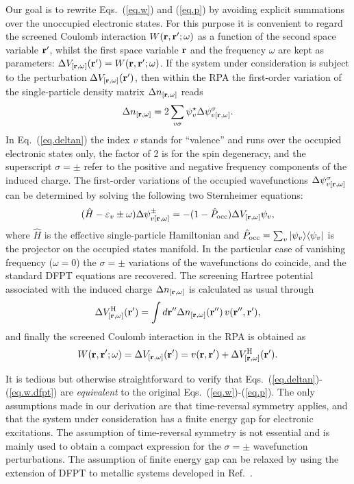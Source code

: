 \documentclass[twocolumn,prb,showpacs,superscriptaddress]{revtex4}
\def\w{\omega}
\def\H{\hat{H}}
\def\P{\hat{P}_{\rm occ}}
\def\E{\varepsilon}
\def\s{\sigma}
\def\r{{\bf r}}
\def\rp{{\bf r^\prime}}
\def\rpp{{\bf r^{\prime\prime}}}
\begin{document}
Our goal is to rewrite Eqs.\ (\ref{eq.w}) and (\ref{eq.p})
by avoiding explicit summations over the unoccupied electronic states.
For this purpose it is convenient to regard the screened Coulomb interaction
$W(\r,\rp;\w)$ as a function of the 
second space variable $\rp$, whilst the first space variable 
$\r$ and the frequency $\w$ are kept as parameters: $\Delta V_{[\r,\w]}(\rp) = W(\r,\rp;\w)$.
If the system under consideration is subject to the perturbation
$\Delta V_{[\r,\w]}(\rp)$, then within the RPA the first-order variation 
of the single-particle density matrix $\Delta n_{[\r,\w]}$ reads
  \begin{equation}\label{eq.deltan}
  \Delta n_{[\r,\w]} = 2\sum_{v\s} \psi_v^\star  \Delta \psi^\s_{v[\r,\w]}.
  \end{equation}
In Eq.\ (\ref{eq.deltan}) the index $v$ stands for ``valence'' and runs
over the occupied electronic states only, the factor of 2 is for the spin degeneracy, 
and the superscript $\sigma=\pm$ refer to the positive and negative
frequency components of the induced charge.
The first-order variations of the occupied wavefunctions $\Delta \psi^\s_{v[\r,\w]}$
can be determined by solving the following two Sternheimer equations:
  \begin{equation}\label{eq.linsys.1}
  (\H-\E_v\pm\w) \Delta \psi^\pm_{v[\r,\w]}  = -(1-\P)  \Delta V_{[\r,\w]} \psi_v, 
  \end{equation}
where $\H$ is the effective single-particle Hamiltonian and 
$\P=\sum_v |\psi_v\rangle\langle\psi_v|$ is the projector
on the occupied states manifold. 
In the particular case of vanishing frequency ($\w=0$)
the $\sigma=\pm$ variations of the wavefunctions do coincide,
and the standard DFPT equations are recovered.
The screening Hartree potential associated with the induced charge 
$\Delta n_{[\r,\w]}$ is calculated as usual through
  \begin{equation}\label{eq.dhartree}
  \Delta V^{\rm H}_{[\r,\w]}(\rp) = \int d\rpp \Delta n_{[\r,\w]} (\rpp) \, v(\rpp,\rp),
  \end{equation}
and finally the screened Coulomb interaction in the RPA is obtained as 
  \begin{equation}\label{eq.w.dfpt}
  W(\r,\rp;\w) = \Delta V_{[\r,\w]}(\rp) = v(\r,\rp) + \Delta V^{\rm H}_{[\r,\w]}(\rp).
  \end{equation}

It is tedious but otherwise straightforward to verify that 
Eqs.\ (\ref{eq.deltan})-(\ref{eq.w.dfpt}) are {\it equivalent} to the 
original Eqs.\ (\ref{eq.w})-(\ref{eq.p}).
The only assumptions made in our derivation are that 
time-reversal symmetry applies,
and that the system under consideration has a finite 
energy gap for electronic excitations. 
The assumption of time-reversal symmetry is not essential and is mainly used to
obtain a compact expression for the $\sigma=\pm$ wavefunction perturbations.
The assumption of finite energy gap can be relaxed by using the extension
of DFPT to metallic systems developed in Ref.\ . 
\end{document}
